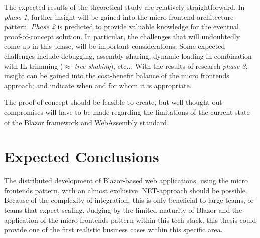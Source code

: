 The expected results of the theoretical study are relatively straightforward. In
\textit{phase 1}, further insight will be gained into the micro frontend
architecture pattern. \textit{Phase 2} is predicted to provide valuable
knowledge for the eventual proof-of-concept solution. In particular, the
challenges that will undoubtedly come up in this phase, will be important
considerations. Some expected challenges include debugging, assembly sharing,
dynamic loading in combination with IL trimming ($\approx$ \textit{tree
shaking}), etc... With the results of research \textit{phase 3}, insight can be
gained into the cost-benefit balance of the micro frontends approach; and
indicate when and for whom it is appropriate. 

The proof-of-concept should be feasible to create, but well-thought-out
compromises will have to be made regarding the limitations of the current state
of the Blazor framework and WebAssembly standard.




\section{Expected Conclusions}
\label{sec:expected-conclusions}

The distributed development of Blazor-based web applications, using the micro
frontends pattern, with an almost exclusive .NET-approach should be possible.
Because of the complexity of integration, this is only beneficial to large
teams, or teams that expect scaling. Judging by the limited maturity of Blazor
and the application of the micro frontends pattern within this tech stack, this
thesis could provide one of the first realistic business cases within this
specific area.